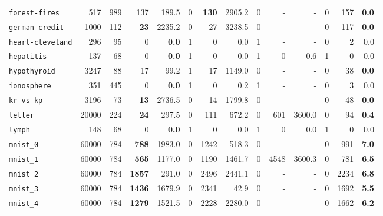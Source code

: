 \begin{tabular}{lccrrrrrrrrrrr}
\texttt{forest-fires} & \multicolumn{1}{r}{517} & \multicolumn{1}{r}{989}  & 137 & 189.5 & 0 & \textbf{130} & 2905.2 & 0 & - & - & 0 & 157 & \textbf{0.0}\\
\texttt{german-credit} & \multicolumn{1}{r}{1000} & \multicolumn{1}{r}{112}  & \textbf{23} & 2235.2 & 0 & 27 & 3238.5 & 0 & - & - & 0 & 117 & \textbf{0.0}\\
\texttt{heart-cleveland} & \multicolumn{1}{r}{296} & \multicolumn{1}{r}{95}  & 0 & \textbf{0.0} & 1 & 0 & 0.0 & 1 & - & - & 0 & 2 & 0.0\\
\texttt{hepatitis} & \multicolumn{1}{r}{137} & \multicolumn{1}{r}{68}  & 0 & \textbf{0.0} & 1 & 0 & 0.0 & 1 & 0 & 0.6 & 1 & 0 & 0.0\\
\texttt{hypothyroid} & \multicolumn{1}{r}{3247} & \multicolumn{1}{r}{88}  & 17 & 99.2 & 1 & 17 & 1149.0 & 0 & - & - & 0 & 38 & \textbf{0.0}\\
\texttt{ionosphere} & \multicolumn{1}{r}{351} & \multicolumn{1}{r}{445}  & 0 & \textbf{0.0} & 1 & 0 & 0.2 & 1 & - & - & 0 & 3 & 0.0\\
\texttt{kr-vs-kp} & \multicolumn{1}{r}{3196} & \multicolumn{1}{r}{73}  & \textbf{13} & 2736.5 & 0 & 14 & 1799.8 & 0 & - & - & 0 & 48 & \textbf{0.0}\\
\texttt{letter} & \multicolumn{1}{r}{20000} & \multicolumn{1}{r}{224}  & \textbf{24} & 297.5 & 0 & 111 & 672.2 & 0 & 601 & 3600.0 & 0 & 94 & \textbf{0.4}\\
\texttt{lymph} & \multicolumn{1}{r}{148} & \multicolumn{1}{r}{68}  & 0 & \textbf{0.0} & 1 & 0 & 0.0 & 1 & 0 & 0.0 & 1 & 0 & 0.0\\
\texttt{mnist\_0} & \multicolumn{1}{r}{60000} & \multicolumn{1}{r}{784}  & \textbf{788} & 1983.0 & 0 & 1242 & 518.3 & 0 & - & - & 0 & 991 & \textbf{7.0}\\
\texttt{mnist\_1} & \multicolumn{1}{r}{60000} & \multicolumn{1}{r}{784}  & \textbf{565} & 1177.0 & 0 & 1190 & 1461.7 & 0 & 4548 & 3600.3 & 0 & 781 & \textbf{6.5}\\
\texttt{mnist\_2} & \multicolumn{1}{r}{60000} & \multicolumn{1}{r}{784}  & \textbf{1857} & 291.0 & 0 & 2496 & 2441.1 & 0 & - & - & 0 & 2234 & \textbf{6.8}\\
\texttt{mnist\_3} & \multicolumn{1}{r}{60000} & \multicolumn{1}{r}{784}  & \textbf{1436} & 1679.9 & 0 & 2341 & 42.9 & 0 & - & - & 0 & 1692 & \textbf{5.5}\\
\texttt{mnist\_4} & \multicolumn{1}{r}{60000} & \multicolumn{1}{r}{784}  & \textbf{1279} & 1521.5 & 0 & 2228 & 2280.0 & 0 & - & - & 0 & 1662 & \textbf{6.2}\\

\end{tabular}
